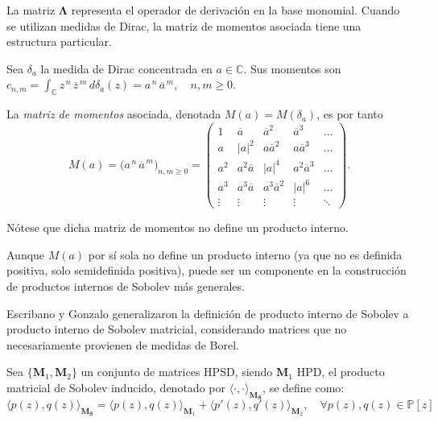 La matriz $\boldsymbol{\Lambda}$ representa el operador de derivación en la base monomial. Cuando se utilizan medidas de Dirac, la matriz de momentos asociada tiene una estructura particular.

\begin{definition}\label{def:dirac_measure_matrix}
	\cite{escribano2025boundedness}
	Sea \(\delta_{a}\) la medida de Dirac concentrada en \(a\in\mathbb C\).
	Sus momentos son
	\(
	c_{n,m}= \displaystyle\int_{\mathbb C} z^{\,n}\,\overline{z}^{\,m}\,d\delta_{a}(z)
	= a^{\,n}\,\overline{a}^{\,m},
	\quad n,m\ge0.
	\)

	La \emph{matriz de momentos} asociada,
	denotada \(M(a)=M(\delta_{a})\), es por tanto
	\[
		M(a)=\bigl(a^{\,n}\,\overline{a}^{\,m}\bigr)_{n,m\ge0}
		=
		\begin{pmatrix}
			1      & \overline{a}      & \overline{a}^{2}      & \overline{a}^{3}      & \dots  \\
			a      & |a|^{2}           & a\overline{a}^{2}     & a\overline{a}^{3}     & \dots  \\
			a^{2}  & a^{2}\overline{a} & |a|^{4}               & a^{2}\overline{a}^{3} & \dots  \\
			a^{3}  & a^{3}\overline{a} & a^{3}\overline{a}^{2} & |a|^{6}               & \dots  \\
			\vdots & \vdots            & \vdots                & \vdots                & \ddots
		\end{pmatrix}.
	\]

	Nótese que dicha matriz de momentos no define un producto interno.
\end{definition}

Aunque $M(a)$ por sí sola no define un producto interno (ya que no es definida positiva, solo semidefinida positiva), puede ser un componente en la construcción de productos internos de Sobolev más generales.

Escribano y Gonzalo generalizaron la definición de producto interno de Sobolev a producto interno de Sobolev matricial, considerando matrices que no necesariamente provienen de medidas de Borel.

\begin{definition}\label{def:sobolev_matrix_product}
	\cite{escribano2025boundedness} Sea $\{\textbf{M}_1,\textbf{M}_2\}$ un conjunto de matrices HPSD, siendo $\textbf{M}_1$ HPD, el producto matricial de Sobolev inducido, denotado por $\langle \cdot, \cdot \rangle_{\textbf{M}_{\textbf{S}}}$, se define como:
	\begin{equation}
		\langle p(z), q(z) \rangle_{\textbf{M}_{\textbf{S}}} = \langle p(z), q(z) \rangle_{\textbf{M}_1} + \langle p'(z), q'(z) \rangle_{\textbf{M}_2},\quad \forall p(z), q(z) \in \mathbb{P}[z]
	\end{equation}
\end{definition}

